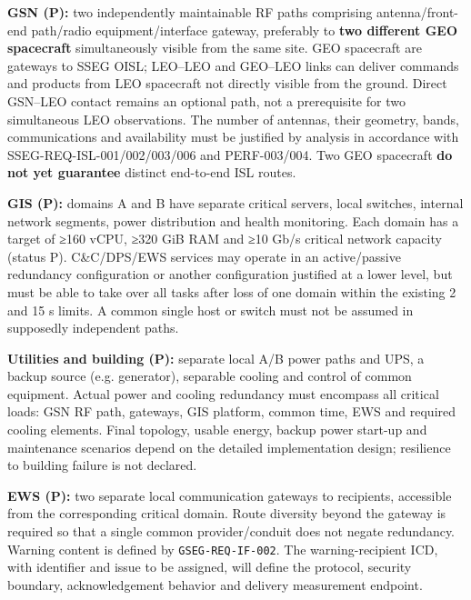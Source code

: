 \textbf{GSN (P):} two independently maintainable RF paths comprising antenna/\allowbreak{}front-end path/\allowbreak{}radio equipment/\allowbreak{}interface gateway, preferably to \textbf{two different GEO spacecraft} simultaneously visible from the same site. GEO spacecraft are gateways to SSEG OISL; LEO–LEO and GEO–LEO links can deliver commands and products from LEO spacecraft not directly visible from the ground. Direct GSN–LEO contact remains an optional path, not a prerequisite for two simultaneous LEO observations. The number of antennas, their geometry, bands, communications and availability must be justified by analysis in accordance with SSEG-REQ-ISL-001/\allowbreak{}002/\allowbreak{}003/\allowbreak{}006 and PERF-003/\allowbreak{}004. Two GEO spacecraft \textbf{do not yet guarantee} distinct end-to-end ISL routes.

\textbf{GIS (P):} domains A and B have separate critical servers, local switches, internal network segments, power distribution and health monitoring. Each domain has a target of ≥160 vCPU, ≥320 GiB RAM and ≥10 Gb/\allowbreak{}s critical network capacity (status P). C\&C/\allowbreak{}DPS/\allowbreak{}EWS services may operate in an active/\allowbreak{}passive redundancy configuration or another configuration justified at a lower level, but must be able to take over all tasks after loss of one domain within the existing 2 and 15 s limits. A common single host or switch must not be assumed in supposedly independent paths.

\textbf{Utilities and building (P):} separate local A/\allowbreak{}B power paths and UPS, a backup source (e.g. generator), separable cooling and control of common equipment. Actual power and cooling redundancy must encompass all critical loads: GSN RF path, gateways, GIS platform, common time, EWS and required cooling elements. Final topology, usable energy, backup power start-up and maintenance scenarios depend on the detailed implementation design; resilience to building failure is not declared.

\textbf{EWS (P):} two separate local communication gateways to recipients, accessible from the corresponding critical domain. Route diversity beyond the gateway is required so that a single common provider/\allowbreak{}conduit does not negate redundancy. Warning content is defined by \texttt{GSEG-REQ-IF-002}. The warning-recipient ICD, with identifier and issue to be assigned, will define the protocol, security boundary, acknowledgement behavior and delivery measurement endpoint.

